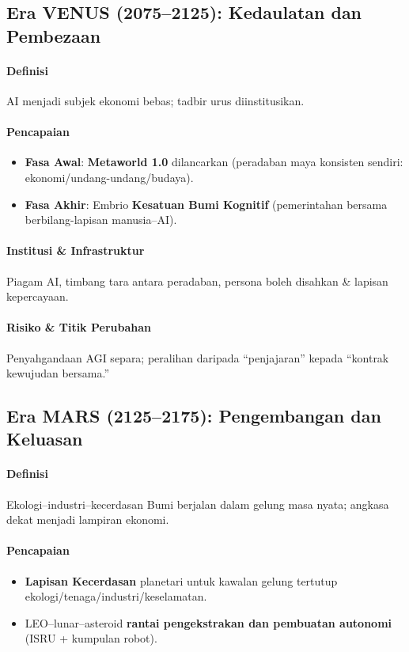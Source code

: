 \documentclass[11pt]{article}
\begin{document}
\subsection{Era VENUS (2075–2125): Kedaulatan dan Pembezaan}
\paragraph{Definisi} AI menjadi subjek ekonomi bebas; tadbir urus diinstitusikan.

\paragraph{Pencapaian}
\begin{itemize}[noitemsep]
  \item \textbf{Fasa Awal}: \textbf{Metaworld 1.0} dilancarkan (peradaban maya konsisten sendiri: ekonomi/undang-undang/budaya).
  \item \textbf{Fasa Akhir}: Embrio \textbf{Kesatuan Bumi Kognitif} (pemerintahan bersama berbilang-lapisan manusia–AI).
\end{itemize}

\paragraph{Institusi \& Infrastruktur} Piagam AI, timbang tara antara peradaban, persona boleh disahkan \& lapisan kepercayaan.

\paragraph{Risiko \& Titik Perubahan} Penyahgandaan AGI separa; peralihan daripada ``penjajaran'' kepada ``kontrak kewujudan bersama.''

\subsection{Era MARS (2125–2175): Pengembangan dan Keluasan}
\paragraph{Definisi} Ekologi–industri–kecerdasan Bumi berjalan dalam gelung masa nyata; angkasa dekat menjadi lampiran ekonomi.

\paragraph{Pencapaian}
\begin{itemize}[noitemsep]
  \item \textbf{Lapisan Kecerdasan} planetari untuk kawalan gelung tertutup ekologi/tenaga/industri/keselamatan.
  \item LEO–lunar–asteroid \textbf{rantai pengekstrakan dan pembuatan autonomi} (ISRU + kumpulan robot).
\end{itemize}
\end{document}

